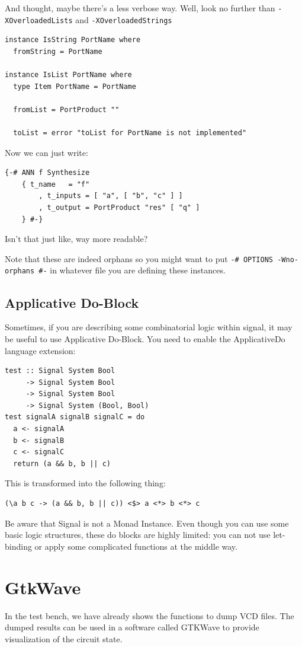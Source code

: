\documentclass[a4paper,12pt, oneside]{book}
\begin{document}
And thought, maybe there's a less verbose way. Well, look no further than \texttt{-XOverloadedLists} and \texttt{-XOverloadedStrings}

\begin{verbatim}
instance IsString PortName where
  fromString = PortName

instance IsList PortName where
  type Item PortName = PortName

  fromList = PortProduct ""

  toList = error "toList for PortName is not implemented"
\end{verbatim}

Now we can just write:

\begin{verbatim}
{-# ANN f Synthesize
    { t_name   = "f"
        , t_inputs = [ "a", [ "b", "c" ] ]
        , t_output = PortProduct "res" [ "q" ]
    } #-}
\end{verbatim}

Isn't that just like, way more readable?

Note that these are indeed orphans so you might want to put \texttt{{-# OPTIONS -Wno-orphans #-}} in whatever file you are defining these instances.

\section*{Applicative Do-Block}
Sometimes, if you are describing some combinatorial logic within signal, it may be useful to use Applicative Do-Block. You need to enable the ApplicativeDo language extension:
\begin{verbatim}
test :: Signal System Bool 
     -> Signal System Bool 
     -> Signal System Bool 
     -> Signal System (Bool, Bool)
test signalA signalB signalC = do
  a <- signalA
  b <- signalB
  c <- signalC
  return (a && b, b || c)
\end{verbatim}
This is transformed into the following thing:
\begin{verbatim}
(\a b c -> (a && b, b || c)) <$> a <*> b <*> c
\end{verbatim}
Be aware that Signal is not a Monad Instance. Even though you can use some basic logic structures, these do blocks are highly limited: you can not use let-binding or apply some complicated functions at the middle way.
\chapter{GtkWave}
In the test bench, we have already shows the functions to dump VCD files. The dumped results can be used in a software called GTKWave to provide visualization of the circuit state.
\end{document}
